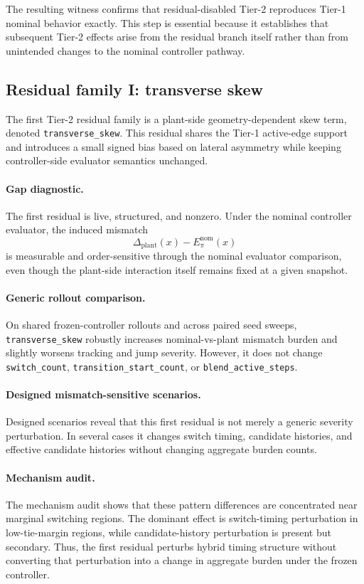 The resulting witness confirms that residual-disabled Tier-2 reproduces Tier-1 nominal behavior exactly. This step is essential because it establishes that subsequent Tier-2 effects arise from the residual branch itself rather than from unintended changes to the nominal controller pathway.

\subsection{Residual family I: transverse skew}
\label{subsec:tier2_transverse_skew}

The first Tier-2 residual family is a plant-side geometry-dependent skew term, denoted \texttt{transverse\_skew}. This residual shares the Tier-1 active-edge support and introduces a small signed bias based on lateral asymmetry while keeping controller-side evaluator semantics unchanged.

\paragraph{Gap diagnostic.}
The first residual is live, structured, and nonzero. Under the nominal controller evaluator, the induced mismatch
\[
\Delta_{\mathrm{plant}}(x)-E_\pi^{\mathrm{nom}}(x)
\]
is measurable and order-sensitive through the nominal evaluator comparison, even though the plant-side interaction itself remains fixed at a given snapshot.

\paragraph{Generic rollout comparison.}
On shared frozen-controller rollouts and across paired seed sweeps, \texttt{transverse\_skew} robustly increases nominal-vs-plant mismatch burden and slightly worsens tracking and jump severity. However, it does not change
\texttt{switch\_count},
\texttt{transition\_start\_count}, or
\texttt{blend\_active\_steps}.

\paragraph{Designed mismatch-sensitive scenarios.}
Designed scenarios reveal that this first residual is not merely a generic severity perturbation. In several cases it changes switch timing, candidate histories, and effective candidate histories without changing aggregate burden counts.

\paragraph{Mechanism audit.}
The mechanism audit shows that these pattern differences are concentrated near marginal switching regions. The dominant effect is switch-timing perturbation in low-tie-margin regions, while candidate-history perturbation is present but secondary. Thus, the first residual perturbs hybrid timing structure without converting that perturbation into a change in aggregate burden under the frozen controller.

